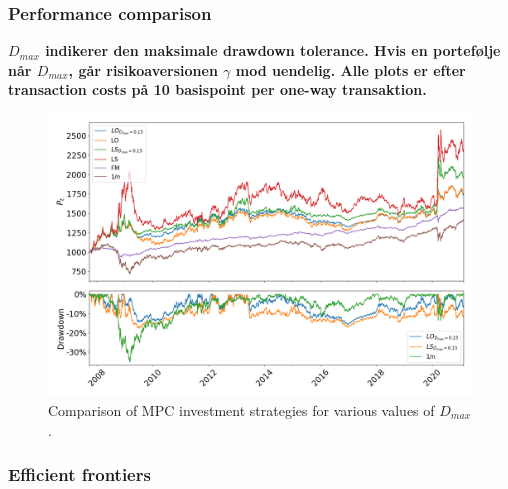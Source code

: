 \subsubsection*{Performance comparison}

\textbf{$D_{max}$ indikerer den maksimale drawdown tolerance. Hvis en portefølje når $D_{max}$, går risikoaversionen $\gamma$ mod uendelig. Alle plots er efter transaction costs på 10 basispoint per one-way transaktion.}

\begin{table}[H]
\centering
\caption[]{}

\label{tab:mpc_performance}
\end{table}

\begin{figure}[H]
    \centering
    \includegraphics[width=1\textwidth]{analysis/portfolio_exercise/images/comparison_perf.png}
    \caption[Comparison of MPC investment strategies for various values of $D_{max}$]{Comparison of MPC investment strategies for various values of $D_{max}$.}
    \label{fig:MPC_port_vals_lo}
\end{figure}

\subsubsection*{Efficient frontiers}

